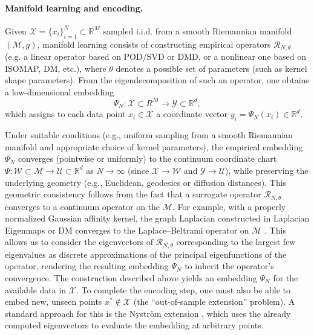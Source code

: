 \documentclass{article}
\begin{document}
\paragraph{Manifold learning and encoding.} Given $\mathcal{X}=\{x_i\}_{i=1}^N\subset\mathbb{R}^M$ sampled i.i.d. from a smooth Riemannian manifold $(\mathcal{M},g)$, manifold learning consists of constructing empirical operators $\mathcal{R}_{N,\theta}$ (e.g. a linear operator based on POD/SVD or DMD, or a nonlinear one based on ISOMAP, DM, etc.), where $\theta$ denotes a possible set of parameters (such as kernel shape parameters). From the eigendecomposition of such an operator, one obtains a low-dimensional embedding
\begin{equation}
\Psi_N: \mathcal{X} \subset{R}^M \to \mathcal{Y} \subset \mathbb{R}^d,
\label{eq:PsiN}
\end{equation}
which assigns to each data point $x_i \in \mathcal{X}$ a coordinate vector $y_i=\Psi_N(x_i) \in \mathbb{R}^d$. 

Under suitable conditions (e.g., uniform sampling from a smooth Riemannian manifold and appropriate choice of kernel parameters), the empirical embedding $\Psi_N$ converges (pointwise or uniformly) to the continuum coordinate chart $\Psi: \mathcal{W}\subset \mathcal{M}\to \mathcal{U} \subset \mathbb{R}^d$ as $N\to\infty$ (since $\mathcal{X}\to \mathcal{W}$ and $\mathcal{Y}\to \mathcal{U}$), while preserving the underlying geometry (e.g., Euclidean, geodesics or diffusion distances). This geometric consistency follows from the fact that a surrogate operator $\mathcal{R}_{N,\theta}$ converges to a continuum operator on the $\mathcal{M}$. For example, with a properly normalized Gaussian affinity kernel, the graph Laplacian constructed in Laplacian Eigenmaps or DM converges to the Laplace–Beltrami operator on $\mathcal{M}$ \cite{belkin2003laplacian,coifman2005geometric,belkin2006convergence,nadler2006diffusion,belkin2008towards}. This allows us to consider the eigenvectors of $\mathcal{R}_{N,\theta}$ corresponding to the largest few eigenvalues as discrete approximations of the principal eigenfunctions of the operator, rendering the resulting embedding $\Psi_{N}$ to inherit the operator's convergence. The construction described above yields an embedding $\Psi_{N}$ for the available data in $\mathcal{X}$. To complete the encoding step, one must also be able to embed new, unseen points $x^* \notin \mathcal{X}$ (the ``out-of-sample extension'' problem). A standard approach for this is the Nystr\"{o}m extension \cite{coifman2006geometric,papaioannou2022time,evangelou2022double,Patsatzis_2023}, which uses the already computed eigenvectors to evaluate the embedding at arbitrary points. %
\end{document}

